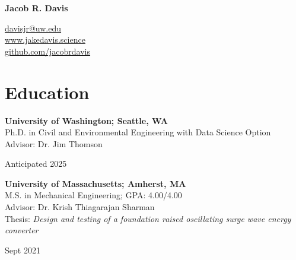 \documentclass[letterpaper,11pt]{article}
\begin{document}
\begin{minipage}[c]{.65\textwidth}
  \flushleft
  \textbf{\LARGE Jacob R. Davis}
\end{minipage}
\hfill
\begin{minipage}[t]{.30\textwidth}
  \flushright
  \href{mailto:jacrdavis@umass.edu}{davisjr@uw.edu}\\
  \href{http://jakedavis.science/}{www.jakedavis.science}\\
  \href{https://github.com/jacobrdavis}{github.com/jacobrdavis}\\
\end{minipage}



\section{Education}

\begin{minipage}[t]{.7\textwidth}
  \flushleft
  \textbf{University of Washington; Seattle, WA}\\
  Ph.D. in Civil and Environmental Engineering with Data Science Option\\
  Advisor: Dr. Jim Thomson
\end{minipage}
  \hfill
  \begin{minipage}[t]{.25\textwidth}
  \flushright
  Anticipated 2025\\
\end{minipage}

\vspace{7pt}

\begin{minipage}[t]{.89\textwidth}
\flushleft
\textbf{University of Massachusetts; Amherst, MA}\\
M.S. in Mechanical Engineering; GPA: 4.00/4.00 \\
Advisor: Dr. Krish Thiagarajan Sharman \\
Thesis: \textit{Design and testing of a foundation raised oscillating surge wave energy converter} %
\end{minipage}
\hfill
\begin{minipage}[t]{.1\textwidth}
\flushright
Sept 2021\\
\end{minipage}
\end{document}
